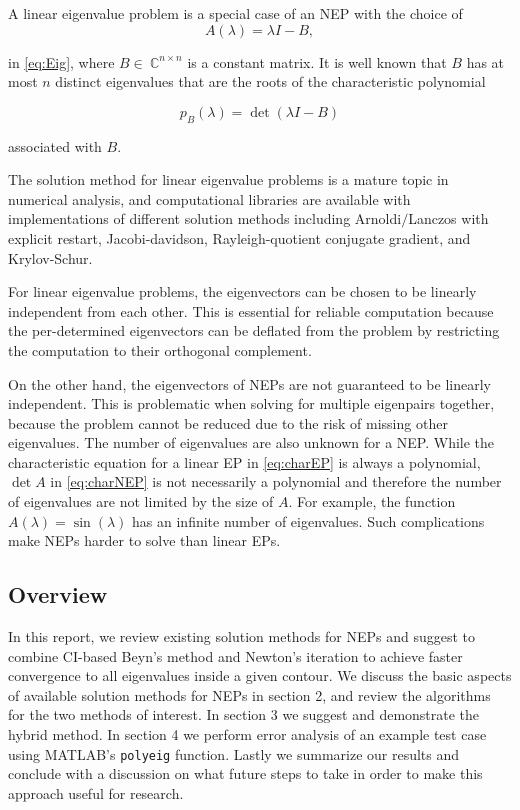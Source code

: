 \documentclass[11pt,letterpaper]{article}
\begin{document}
A linear eigenvalue problem is a special case of an NEP with the choice of 
\begin{equation} 
\label{eq:LEP}
A(\lambda )= \lambda I - B,
\end{equation}

in \ref{eq:Eig}, where $B \in\ \mathbb{C}^{n \times n}$ is a constant matrix. It is well known that $B$ has at most $n$ distinct eigenvalues that are the roots of the characteristic polynomial

\begin{equation}
	\label{eq:charEP}
	p_{B}(\lambda)=\det(\lambda I -B)
\end{equation}  

associated with $B$. 

The solution method for linear eigenvalue problems is a mature topic in numerical analysis, and computational libraries are available with implementations of different solution methods including Arnoldi$/$Lanczos with explicit restart, Jacobi-davidson, Rayleigh-quotient conjugate gradient, and Krylov-Schur.  \citep{hernandez2005slepc} 

For linear eigenvalue problems, the eigenvectors can be chosen to be linearly independent from each other. This is essential for reliable computation because the per-determined eigenvectors can be deflated from the problem by restricting the computation to their orthogonal complement. 

On the other hand, the eigenvectors of NEPs are not guaranteed to be linearly independent. This is problematic when solving for multiple eigenpairs together, because the problem cannot be reduced due to the risk of missing other eigenvalues. The number of eigenvalues are also unknown for a NEP. While the characteristic equation for a linear EP in \ref{eq:charEP} is always a polynomial, $\det A$ in \ref{eq:charNEP} is not necessarily a polynomial and therefore the number of eigenvalues are not limited by the size of $A$. For example, the function $ A(\lambda) = \sin(\lambda) $ has an infinite number of eigenvalues. Such complications make NEPs harder to solve than linear EPs. 

\subsection{Overview}
In this report, we review existing solution methods for NEPs and suggest to combine CI-based Beyn's method and Newton's iteration to achieve faster convergence to all eigenvalues inside a given contour. We discuss the basic aspects of available solution methods for NEPs in section 2, and review the algorithms for the two methods of interest. In section 3 we suggest and demonstrate the hybrid method. In section 4 we perform error analysis of an example test case using MATLAB's {\tt polyeig} function. Lastly we summarize our results and conclude with a discussion on what future steps to take in order to make this approach useful for research. 
\end{document}

